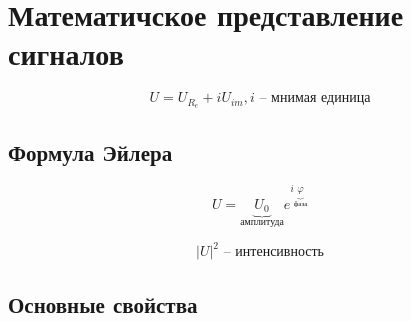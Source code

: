 \section{Математичское представление сигналов}

\begin{equation*}
    U = U_{R_e} + i U_{im}, i \text{ -- мнимая единица}
\end{equation*}

\subsection{Формула Эйлера}

\begin{equation*}
    U = \underbrace{U_0}_{\text{амплитуда}} e^{i \underbrace{\varphi}_{\text{фаза}}}
\end{equation*}

\begin{equation*}
    |U|^2 \text{ -- интенсивность}
\end{equation*}

\subsection{Основные свойства}

